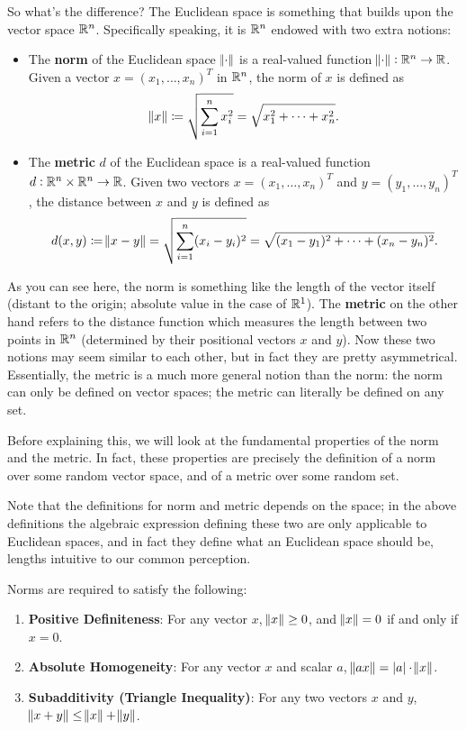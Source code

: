 So what's the difference? The Euclidean space is something that builds upon the vector space $\mathbb R^n$. Specifically speaking, it is $\mathbb R^n$ endowed with two extra notions:
\begin{itemize}
\item The \textbf{norm} of the Euclidean space $\norm{\cdot}$ is a real-valued function $\norm{\cdot}:\mathbb R^n\to\mathbb R$. Given a vector $x=(x_1,\dots,x_n)^T$ in $\mathbb R^n$, the norm of $x$ is defined as
\[ \norm{x}\coloneqq\sqrt{\sum_{i=1}^nx_i^2}=\sqrt{x_1^2+\cdots+x_n^2}. \]
\item The \textbf{metric} $d$ of the Euclidean space is a real-valued function $d:\mathbb R^n\times\mathbb R^n\to\mathbb R$. Given two vectors $x=(x_1,\dots,x_n)^T$ and $y=(y_1,\dots,y_n)^T$, the distance between $x$ and $y$ is defined as
\[ d(x,y)\coloneqq\norm{x-y}=\sqrt{\sum_{i=1}^n(x_i-y_i)^2}=\sqrt{(x_1-y_1)^2+\cdots+(x_n-y_n)^2}. \]
\end{itemize}

As you can see here, the norm is something like the length of the vector itself (distant to the origin; absolute value in the case of $\mathbb R^1$). The \textbf{metric} on the other hand refers to the distance function which measures the length between two points in $\mathbb R^n$ (determined by their positional vectors $x$ and $y$). Now these two notions may seem similar to each other, but in fact they are pretty asymmetrical. Essentially, the metric is a much more general notion than the norm: the norm can only be defined on vector spaces; the metric can literally be defined on any set.

Before explaining this, we will look at the fundamental properties of the norm and the metric. In fact, these properties are precisely the definition of a norm over some random vector space, and of a metric over some random set.
\begin{remark}
Note that the definitions for norm and metric depends on the space; in the above definitions the algebraic expression defining these two are only applicable to Euclidean spaces, and in fact they define what an Euclidean space should be, lengths intuitive to our common perception.
\end{remark}

Norms are required to satisfy the following:
\begin{enumerate}
\item \textbf{Positive Definiteness}: For any vector $x$, $\norm{x}\ge0$, and $\norm{x}=0$ if and only if $x=0$.
\item \textbf{Absolute Homogeneity}: For any vector $x$ and scalar $a$, $\norm{ax}=|a|\cdot\norm{x}$.
\item \textbf{Subadditivity (Triangle Inequality)}: For any two vectors $x$ and $y$, $\norm{x+y}\le\norm{x}+\norm{y}$.
\end{enumerate}

